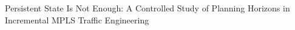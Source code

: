 Persistent State Is Not Enough: A Controlled Study of Planning Horizons in Incremental MPLS Traffic Engineering